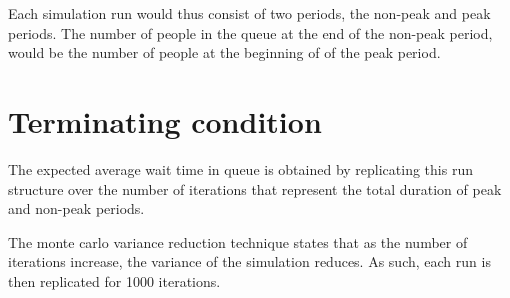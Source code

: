 \documentclass{article}
\begin{document}
Each simulation run would thus consist of two periods, the non-peak and peak periods. The number of people in the queue at the end of the non-peak period, would be the number of people at the beginning of of the peak period.

\section{Terminating condition}
The expected average wait time in queue is obtained by replicating this run structure over the number of iterations that represent the total duration of peak and non-peak periods. 

The monte carlo variance reduction technique states that as the number of iterations increase, the variance of the simulation reduces. As such, each run is then replicated for 1000 iterations. 
\end{document}
